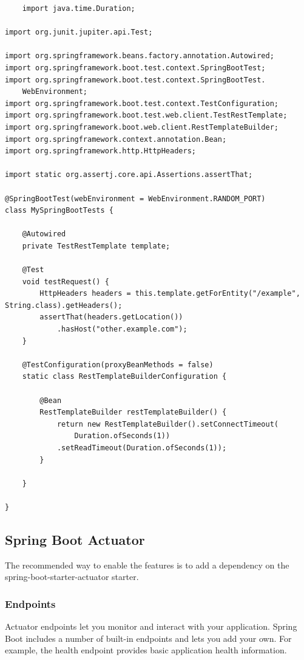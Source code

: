 \documentclass{scrartcl}
\begin{document}
\begin{lstlisting}
    import java.time.Duration;

import org.junit.jupiter.api.Test;

import org.springframework.beans.factory.annotation.Autowired;
import org.springframework.boot.test.context.SpringBootTest;
import org.springframework.boot.test.context.SpringBootTest.
    WebEnvironment;
import org.springframework.boot.test.context.TestConfiguration;
import org.springframework.boot.test.web.client.TestRestTemplate;
import org.springframework.boot.web.client.RestTemplateBuilder;
import org.springframework.context.annotation.Bean;
import org.springframework.http.HttpHeaders;

import static org.assertj.core.api.Assertions.assertThat;

@SpringBootTest(webEnvironment = WebEnvironment.RANDOM_PORT)
class MySpringBootTests {

    @Autowired
    private TestRestTemplate template;

    @Test
    void testRequest() {
        HttpHeaders headers = this.template.getForEntity("/example", String.class).getHeaders();
        assertThat(headers.getLocation())
            .hasHost("other.example.com");
    }

    @TestConfiguration(proxyBeanMethods = false)
    static class RestTemplateBuilderConfiguration {

        @Bean
        RestTemplateBuilder restTemplateBuilder() {
            return new RestTemplateBuilder().setConnectTimeout(
                Duration.ofSeconds(1))
            .setReadTimeout(Duration.ofSeconds(1));
        }

    }

}
\end{lstlisting}


\subsection{Spring Boot Actuator}

The recommended way to enable the features is to add a dependency on the spring-boot-starter-actuator starter.

\subsubsection{Endpoints}

Actuator endpoints let you monitor and interact with your application. Spring Boot includes a number of built-in endpoints and lets you add your own. For example, the health endpoint provides basic application health information.
\end{document}
